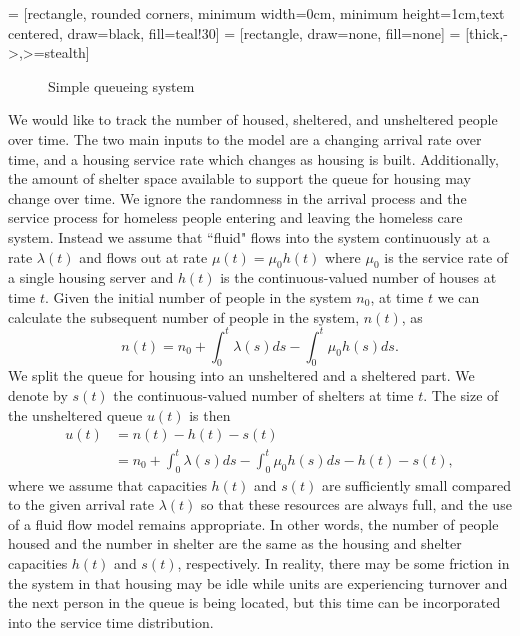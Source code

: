 \documentclass[12pt,a4paper]{article}
\begin{document}
 = [rectangle, rounded corners, minimum width=0cm, minimum height=1cm,text centered, draw=black, fill=teal!30]
 = [rectangle, draw=none, fill=none]
 = [thick,->,>=stealth]
%
\begin{figure} 
  \begin{center}
    \caption{Simple queueing system} \label{fig:simple-q}
  \end{center}
\end{figure}
%
We would like to track the number of housed, sheltered, and unsheltered people over time. The two main inputs to the model are a changing arrival rate over time, and a housing service rate which changes as housing is built.  Additionally, the amount of shelter space available to support the queue for housing may change over time. We ignore the randomness in the arrival process and the service process for homeless people entering and leaving the homeless care system. Instead we assume that ``fluid" flows into the system continuously at a rate $\lambda(t)$ and flows out at  rate $\mu(t) = \mu_{0}h(t)$ where $\mu_{0}$ is the service rate of a single housing server and $h(t)$ is the continuous-valued number of houses at time $t$. Given the initial number of people in the system $n_0$, at time $t$ we can calculate the subsequent number of people in the system, $n(t)$, as
%
\begin{equation*} \label{x_t}
n(t) = n_0 + \int_{0}^{t} \lambda(s) ds - \int_{0}^{t} \mu_0 h(s) ds.
\end{equation*}
%
We split the queue for housing into an unsheltered and a sheltered part. We denote by $s(t)$ the continuous-valued number of shelters at time $t$. The size of the unsheltered queue $u(t)$ is then 
%
\begin{align} 
u(t) & = n(t) - h(t) - s(t) \\
& = n_0 + \int_{0}^{t} \lambda(s) ds - \int_{0}^{t} \mu_0 h(s) ds - h(t) - s(t),
\label{u_t}
\end{align}
%
where we assume that capacities $h(t)$ and $s(t)$ are sufficiently small compared to the given arrival rate $\lambda(t)$ so that these resources are always full, and the use of a fluid flow model remains appropriate. In other words, the number of people housed and the number in shelter are the same as the housing and shelter capacities $h(t)$ and $s(t)$, respectively. In reality, there may be some friction in the system in that housing may be idle while units are experiencing turnover and the next person in the queue is being located, but this time can be incorporated into the service time distribution.
\end{document}
